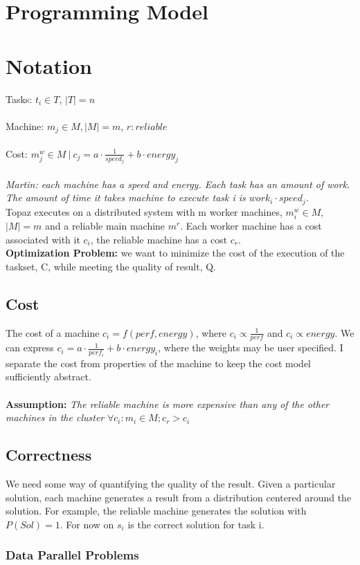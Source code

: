 \documentclass[11pt, oneside]{article}   	%
\begin{document}
\section {Programming Model}
\section {Notation}
Tasks: $t_i \in T$, $|T| = n$\\\\
Machine: $m_j \in M, |M| = m$, $r: reliable$\\\\
Cost: $m_j^w \in M ~|~ c_j = a \cdot \frac 1 {speed_j} + b \cdot {energy_j}$\\\\
\textit{Martin: each machine has a speed and energy. Each task has an amount of work. The amount of time it takes machine to execute task i is $work_i \cdot speed_j$.}\\
Topaz executes on a distributed system with m worker machines, $m_i^w \in M$, $|M| = m$ and a reliable main machine $m^r$. Each worker machine has a cost associated with it $c_i$, the reliable machine has a cost $c_r$.\\
\textbf{Optimization Problem:} we want to minimize the cost of the execution of the taskset, C, while meeting the quality of result, Q.
\subsection {Cost}
The cost of a machine $c_i = f(perf,energy)$, where $c_i \propto \frac 1 {perf}$ and $c_i \propto energy$. We can express $c_i = a \cdot \frac 1 {perf_i} + b \cdot energy_i$, where the weights may be user specified. I separate the cost from properties of the machine to keep the cost model sufficiently abstract.\\\\
\textbf{Assumption:} \textit{The reliable machine is more expensive than any of the other machines in the cluster} $\forall c_i : m_i \in M; c_r > c_i$
\subsection {Correctness}
We need some way of quantifying the quality of the result. Given a particular solution, each machine generates a result from a distribution centered around the solution. For example, the reliable machine generates the solution with $P(Sol) = 1$. For now on $s_i$ is the correct solution for task i.
\subsubsection {Data Parallel Problems}
\end{document}
